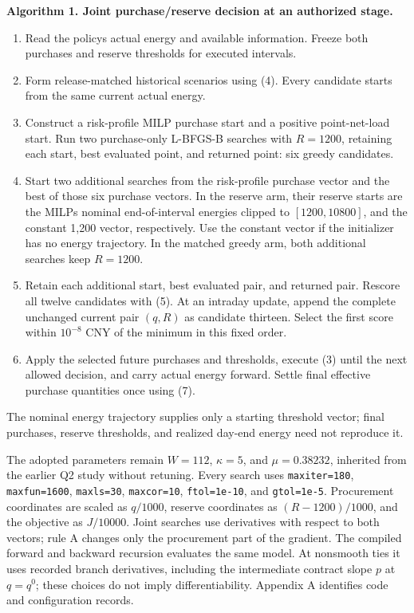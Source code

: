 
\textbf{Algorithm 1. Joint purchase/reserve decision at an authorized stage.}

\begin{enumerate}
\def\labelenumi{\arabic{enumi}.}
\tightlist
\item
  Read the policy\textquotesingle s actual energy and available information. Freeze both purchases and reserve thresholds for executed intervals.
\item
  Form release-matched historical scenarios using (4). Every candidate starts from the same current actual energy.
\item
  Construct a risk-profile MILP purchase start and a positive point-net-load start. Run two purchase-only L-BFGS-B searches with \(R=1200\), retaining each start, best evaluated point, and returned point: six greedy candidates.
\item
  Start two additional searches from the risk-profile purchase vector and the best of those six purchase vectors. In the reserve arm, their reserve starts are the MILP\textquotesingle s nominal end-of-interval energies clipped to \([1200,10800]\), and the constant 1,200 vector, respectively. Use the constant vector if the initializer has no energy trajectory. In the matched greedy arm, both additional searches keep \(R=1200\).
\item
  Retain each additional start, best evaluated pair, and returned pair. Rescore all twelve candidates with (5). At an intraday update, append the complete unchanged current pair \((q,R)\) as candidate thirteen. Select the first score within \(10^{-8}\) CNY of the minimum in this fixed order.
\item
  Apply the selected future purchases and thresholds, execute (3) until the next allowed decision, and carry actual energy forward. Settle final effective purchase quantities once using (7).
\end{enumerate}

The nominal energy trajectory supplies only a starting threshold vector; final purchases, reserve thresholds, and realized day-end energy need not reproduce it.

The adopted parameters remain \(W=112\), \(\kappa=5\), and \(\mu=0.38232\), inherited from the earlier Q2 study without retuning. Every search uses \nolinkurl{maxiter=180}, \nolinkurl{maxfun=1600}, \nolinkurl{maxls=30}, \nolinkurl{maxcor=10}, \nolinkurl{ftol=1e-10}, and \nolinkurl{gtol=1e-5}. Procurement coordinates are scaled as \(q/1000\), reserve coordinates as \((R-1200)/1000\), and the objective as \(J/10000\). Joint searches use derivatives with respect to both vectors; rule A changes only the procurement part of the gradient. The compiled forward and backward recursion evaluates the same model. At nonsmooth ties it uses recorded branch derivatives, including the intermediate contract slope \(p\) at \(q=q^0\); these choices do not imply differentiability. Appendix A identifies code and configuration records.

